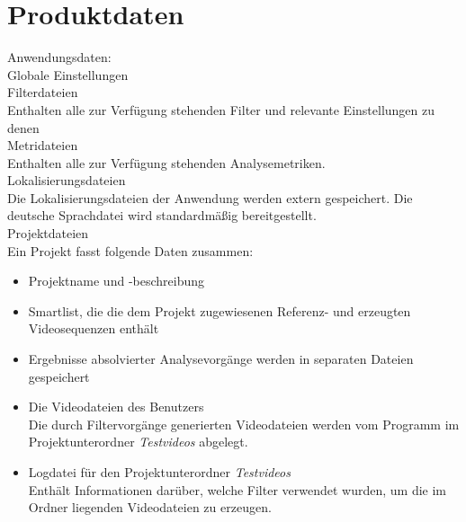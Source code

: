 

\chapter{Produktdaten}
\setcounter{counterKriterien}{0}
Anwendungsdaten: \\
 Globale Einstellungen \\
 Filterdateien \\
Enthalten alle zur Verfügung stehenden Filter und relevante Einstellungen zu denen \\
 Metridateien \\
Enthalten alle zur Verfügung stehenden Analysemetriken. \\
 Lokalisierungsdateien \\
Die Lokalisierungsdateien der Anwendung werden extern gespeichert. Die deutsche Sprachdatei wird standardmäßig bereitgestellt. \\
 Projektdateien \\
Ein Projekt fasst folgende Daten zusammen:
\begin{itemize}
\item Projektname und -beschreibung
\item Smartlist, die die dem Projekt zugewiesenen Referenz- und erzeugten Videosequenzen enthält
\item Ergebnisse absolvierter Analysevorgänge werden in separaten Dateien gespeichert
\item Die Videodateien des Benutzers \\
Die durch Filtervorgänge generierten Videodateien werden vom Programm im Projektunterordner \emph{Testvideos} abgelegt.
\item Logdatei für den Projektunterordner \emph{Testvideos} \\
Enthält Informationen darüber, welche Filter verwendet wurden, um die im Ordner liegenden Videodateien zu erzeugen.
\end{itemize}